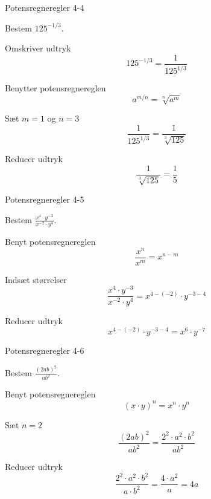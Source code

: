 \documentclass{article}
\begin{document}
\begin{exercise}{Potensregneregler 4-4}
	
	Bestem $125^{-1/3}$.
	
	
	\hint
	
	Omskriver udtryk
	\[
	125^{-1/3} = \frac{1}{125^{1/3}}
	\]
	
	\hint
	
	Benytter potensregnereglen
	\[
	a^{m/n} = \sqrt[n]{a^m}
	\]
	
	\hint 
	
	Sæt $m=1$ og $n=3$
	\[
	\frac{1}{125^{1/3}} = \frac{1}{\sqrt[3]{125}}
	\]
	
	\hint
	
	Reducer udtryk
	\[
	 \frac{1}{\sqrt[3]{125}} = \frac{1}{5}
	\]
	
	
\end{exercise}

\newpage

\begin{exercise}{Potensregneregler 4-5}
	
	Bestem $\frac{x^4 \cdot y^{-3}}{x^{-2} \cdot y^{4}}$.
	
	
	\hint
	
	Benyt potensregnereglen
	\[
	\frac{x^n}{x^m} = x^{n-m}
	\]
	
	\hint 
	
	Indsæt størrelser
	\[
	\frac{x^4 \cdot y^{-3}}{x^{-2} \cdot y^{4}} = x^{4-(-2)} \cdot y^{-3-4} 
	\]
	
	\hint
	
	Reducer udtryk
	\[
	x^{4-(-2)} \cdot y^{-3-4}  = x^6 \cdot y^{-7}
	\]
	
	
\end{exercise}

\newpage

\begin{exercise}{Potensregneregler 4-6}
	
	Bestem $\frac{(2ab)^2}{ab^2}$.
	
	
	\hint
	
	Benyt potensregnereglen
	\[
	(x\cdot y)^n = x^n \cdot y^n
	\]
	
	\hint 
	
	Sæt $n=2$
	\[
	\frac{(2ab)^2}{ab^2} = \frac{2^2 \cdot a^2 \cdot b^2}{ab^2}
	\]
	
	\hint
	
	Reducer udtryk
	\[
	\frac{2^2 \cdot a^2 \cdot b^2}{a \cdot b^2} = \frac{4 \cdot a^2}{a} = 4a
	\]
	
	
\end{exercise}
\end{document}
